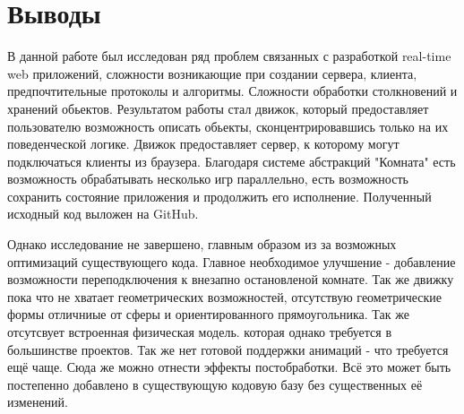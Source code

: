 \documentclass[a4paper,14pt, openany]{book}
\begin{document}
\chapter{Выводы}

В данной работе был исследован ряд проблем связанных с разработкой real-time web приложений, сложности возникающие при создании сервера, клиента, предпочтительные протоколы и алгоритмы. Сложности обработки столкновений и хранений обьектов. Результатом работы стал движок, который предоставляет пользователю возможность описать обьекты, сконцентрировавшись только на их поведенческой логике. Движок предоставляет сервер, к которому могут подключаться клиенты из браузера. Благодаря системе абстракций "Комната" есть возможность обрабатывать несколько игр параллельно, есть возможность сохранить состояние приложения и продолжить его исполнение. Полученный исходный код выложен на GitHub.

Однако исследование не завершено, главным образом из за возможных оптимизаций существующего кода. Главное необходимое улучшение - добавление возможности переподключения к внезапно остановленой комнате. Так же движку пока что не хватает геометрических возможностей, отсутствую геометрические формы отличниые от сферы и ориентированного прямоугольника. Так же отсутсвует встроенная физическая модель. которая однако требуется в большинстве проектов. Так же нет готовой поддержки анимаций - что требуется ещё чаще. Сюда же можно отнести эффекты постобработки. Всё это может быть постепенно добавлено в существующую кодовую базу без существенных её изменений.




\end{document}
